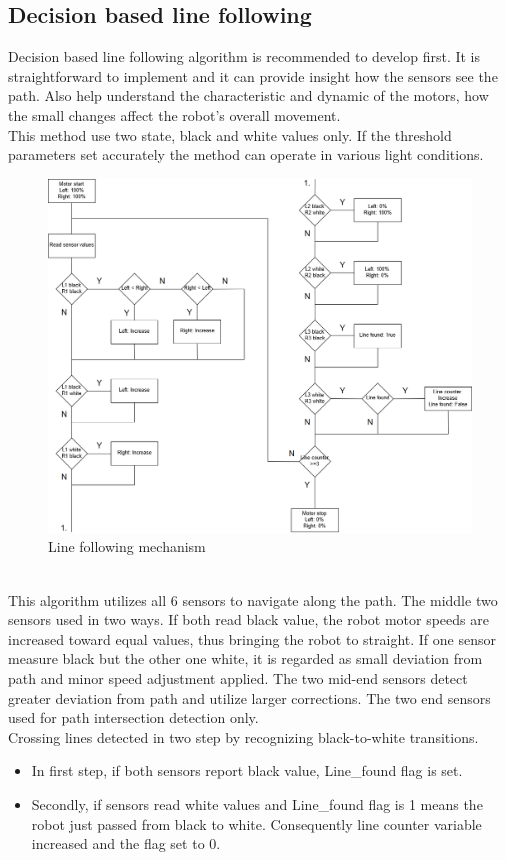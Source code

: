 \documentclass[11pt,a4paper,oneside,article]{memoir}
\begin{document}
\subsection{Decision based line following}
Decision based line following algorithm is recommended to develop first. It is straightforward to implement and it can provide insight how the sensors see the path. Also help understand the characteristic and dynamic of the motors, how the small changes affect the robot's overall movement.\\
This method use two state, black and white values only. If the threshold parameters set accurately the method can operate in various light conditions.
\begin{figure}[h]
	\centering
	\includegraphics[width=15cm]{illustration/If-then-algorithm}
	\caption{Line following mechanism}
	\label{fig:If-then-algorithm}
\end{figure}\\
This algorithm utilizes all 6 sensors to navigate along the path. The middle two sensors used in two ways. If both read black value, the robot motor speeds are increased toward equal values, thus bringing the robot to straight. If one sensor measure black but the other one white, it is regarded as small deviation from path and minor speed adjustment applied. The two mid-end sensors detect greater deviation from path and utilize larger corrections. The two end sensors used for path intersection detection only.\\
Crossing lines detected in two step by recognizing black-to-white transitions.
\begin{itemize}
	\item In first step, if both sensors report black value, Line\_found flag is set.
	\item Secondly, if sensors read white values and Line\_found flag is 1 means the robot just passed from black to white. Consequently line counter variable increased and the flag set to 0.
\end{itemize}
\end{document}
